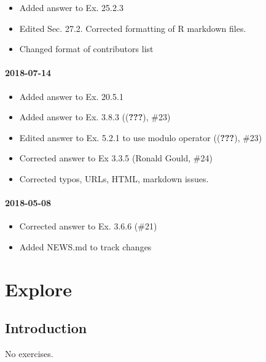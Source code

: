 \documentclass[]{book}
\providecommand{\tightlist}{%
  \setlength{\itemsep}{0pt}\setlength{\parskip}{0pt}}
\theoremstyle{plain}
\theoremstyle{remark}
\theoremstyle{definition}
\theoremstyle{definition}
\theoremstyle{definition}
\theoremstyle{remark}
\begin{document}
\begin{itemize}
\tightlist
\item
  Added answer to Ex. 25.2.3
\item
  Edited Sec. 27.2. Corrected formatting of R markdown files.
\item
  Changed format of contributors list
\end{itemize}

\hypertarget{section-3}{%
\subsection*{2018-07-14}\label{section-3}}

\begin{itemize}
\tightlist
\item
  Added answer to Ex. 20.5.1
\item
  Added answer to Ex. 3.8.3 (({\textbf{???}}), \#23)
\item
  Edited answer to Ex. 5.2.1 to use modulo operator (({\textbf{???}}),
  \#23)
\item
  Corrected answer to Ex 3.3.5 (Ronald Gould, \#24)
\item
  Corrected typos, URLs, HTML, markdown issues.
\end{itemize}

\hypertarget{section-4}{%
\subsection*{2018-05-08}\label{section-4}}

\begin{itemize}
\tightlist
\item
  Corrected answer to Ex. 3.6.6 (\#21)
\item
  Added NEWS.md to track changes
\end{itemize}

\hypertarget{part-explore}{%
\part{Explore}\label{part-explore}}

\hypertarget{explore-intro}{%
\chapter{Introduction}\label{explore-intro}}

No exercises.
\end{document}
